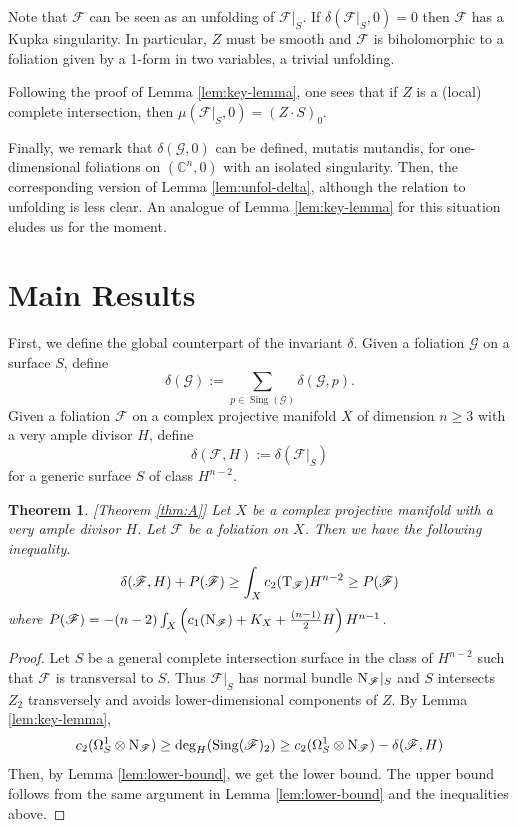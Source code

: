 \documentclass[a4paper, 11pt]{amsart}
\newcommand{\CC}{\mathbb{C}}
\theoremstyle{plain}
\newtheorem{theorem}{Theorem}
\numberwithin{theorem}{section}
\theoremstyle{definition}
\DeclareMathOperator{\sing}{Sing}
\newcommand{\sF}{\mathscr{F}}
\newcommand{\sG}{\mathscr{G}}
\newcommand{\tF}{{\rm T}_\mathscr{F}}
\newcommand{\nF}{{\rm N}_\mathscr{F}}
\begin{document}
Note that $\sF$ can be seen as an unfolding of $\sF|_S$. If $\delta(\sF|_S,0) = 0$ then $\sF$ has a Kupka singularity. In particular, $Z$ must be smooth and $\sF$ is biholomorphic to a foliation given by a 1-form in two variables, a trivial unfolding. 

Following the proof of Lemma \ref{lem:key-lemma}, one sees that if $Z$ is a (local) complete intersection, then $\mu(\sF|_S,0)  = (Z\cdot S)_0$.

Finally, we remark that $\delta(\sG,0)$ can be defined, mutatis mutandis, for one-dimensional foliations on $(\CC^n,0)$ with an isolated singularity. Then, the corresponding version of Lemma \ref{lem:unfol-delta}, although the relation to unfolding is less clear. An analogue of Lemma \ref{lem:key-lemma} for this situation eludes us for the moment. 




\section{Main Results}\label{sec:Main}
First, we define the global counterpart of the invariant $\delta$. Given a foliation $\sG$ on a surface $S$, define
\[
\delta(\sG) := \sum_{p\in \sing(\sG)} \delta(\sG,p). 
\]
Given a foliation $\sF$ on a complex projective manifold $X$ of dimension $n\geq 3$ with a very ample divisor $H$, define 
\[
\delta(\sF,H) := \delta(\sF|_S)
\]
for a generic surface $S$ of class $H^{n-2}$. 


\begin{theorem}\label{thm:general}[Theorem \ref{thm:A}]
  Let $X$ be a complex projective manifold with a very ample divisor $H$. Let $\sF$ be a foliation on $X$. Then we have the following inequality.
  \[
  \delta(\sF,H) + P(\sF) \geq \int_Xc_2(\tF)H^{n-2} \geq P(\sF)
  \]
  where $P(\sF) = -(n-2)\int_X \left(  c_1(\nF) +K_X +\frac{(n-1) }{2} H\right)H^{n-1}$.
\end{theorem}



\begin{proof}
 Let $S$ be a general complete intersection surface in the class of $H^{n-2}$ such that $\sF$ is transversal to $S$. Thus $\sF|_S$ has normal bundle $\nF|_S$ and $S$ intersects $Z_2$ transversely and avoids lower-dimensional components of $Z$. By Lemma \ref{lem:key-lemma},
 \begin{equation}
    c_2(\Omega^1_S \otimes \nF) \geq \deg_H(\sing(\sF)_2) \geq c_2(\Omega^1_S \otimes \nF) - \delta(\sF,H)
\end{equation}
Then, by Lemma \ref{lem:lower-bound}, we get the lower bound. The upper bound follows from the same argument in Lemma \ref{lem:lower-bound} and the inequalities above. 
\end{proof}
\end{document}
